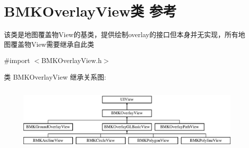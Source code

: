 \hypertarget{interface_b_m_k_overlay_view}{}\section{B\+M\+K\+Overlay\+View类 参考}
\label{interface_b_m_k_overlay_view}


该类是地图覆盖物\+View的基类，提供绘制overlay的接口但本身并无实现，所有地图覆盖物\+View需要继承自此类  




{\ttfamily \#import $<$B\+M\+K\+Overlay\+View.\+h$>$}

类 B\+M\+K\+Overlay\+View 继承关系图\+:\begin{figure}[H]
\begin{center}
\leavevmode
\includegraphics[height=3.333333cm]{interface_b_m_k_overlay_view}
\end{center}
\end{figure}
